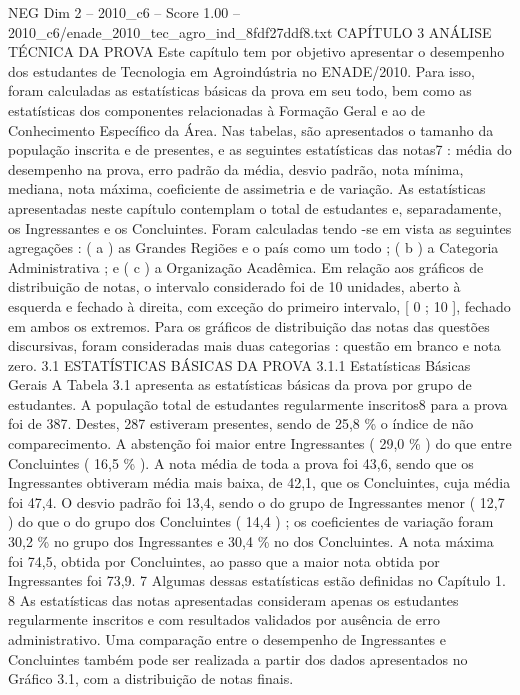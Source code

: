 \begin{textsample}{NEG Dim 2 – 2010\_c6 – Score 1.00 – 2010\_c6/enade\_2010\_tec\_agro\_ind\_8fdf27ddf8.txt}  \label{ex:f2_neg_248}
CAPÍTULO 3 ANÁLISE TÉCNICA DA PROVA Este capítulo tem por objetivo apresentar o desempenho dos estudantes de Tecnologia em Agroindústria no ENADE/2010.
Para isso, foram calculadas as estatísticas básicas da prova em seu todo, bem como as estatísticas dos componentes relacionadas à Formação Geral e ao de Conhecimento Específico da Área.
Nas tabelas, são apresentados o tamanho da população inscrita e de presentes, e as seguintes estatísticas das notas7 : média do desempenho na prova, erro padrão da média, desvio padrão, nota mínima, mediana, nota máxima, coeficiente de assimetria e de variação.
As estatísticas apresentadas neste capítulo contemplam o total de estudantes e, separadamente, os Ingressantes e os Concluintes.
Foram calculadas tendo -se em vista as seguintes agregações : ( a ) as Grandes Regiões e o país como um todo ; ( b ) a Categoria Administrativa ; e ( c ) a Organização Acadêmica.
Em relação aos gráficos de distribuição de notas, o intervalo considerado foi de 10 unidades, aberto à esquerda e fechado à direita, com exceção do primeiro intervalo, [ 0 ; 10 ], fechado em ambos os extremos.
Para os gráficos de distribuição das notas das questões discursivas, foram consideradas mais duas categorias : questão em branco e nota zero. 3.1 ESTATÍSTICAS BÁSICAS DA PROVA 3.1.1 Estatísticas Básicas Gerais A Tabela 3.1 apresenta as estatísticas básicas da prova por grupo de estudantes.
A população total de estudantes regularmente inscritos8 para a prova foi de 387.
Destes, 287 estiveram presentes, sendo de 25,8 \% o índice de não comparecimento.
A abstenção foi maior entre Ingressantes ( 29,0 \% ) do que entre Concluintes ( 16,5 \% ).
A nota média de toda a prova foi 43,6, sendo que os Ingressantes obtiveram média mais baixa, de 42,1, que os Concluintes, cuja média foi 47,4.
O desvio padrão foi 13,4, sendo o do grupo de Ingressantes menor ( 12,7 ) do que o do grupo dos Concluintes ( 14,4 ) ; os coeficientes de variação foram 30,2 \% no grupo dos Ingressantes e 30,4 \% no dos Concluintes.
A nota máxima foi 74,5, obtida por Concluintes, ao passo que a maior nota obtida por Ingressantes foi 73,9. 7 Algumas dessas estatísticas estão definidas no Capítulo 1. 8 As estatísticas das notas apresentadas consideram apenas os estudantes regularmente inscritos e com resultados validados por ausência de erro administrativo.
Uma comparação entre o desempenho de Ingressantes e Concluintes também pode ser realizada a partir dos dados apresentados no Gráfico 3.1, com a distribuição de notas finais.

\end{textsample}
